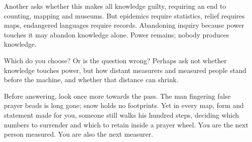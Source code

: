 Another asks whether this makes all knowledge guilty, requiring an end to counting, mapping and museums. But epidemics require statistics, relief requires maps, endangered languages require records. Abandoning inquiry because power touches it may abandon knowledge alone. Power remains; nobody produces knowledge.

Which do you choose? Or is the question wrong? Perhaps ask not whether knowledge touches power, but how distant measurers and measured people stand before the machine, and whether that distance can shrink.

Before answering, look once more towards the pass. The man fingering false prayer beads is long gone; snow holds no footprints. Yet in every map, form and statement made for you, someone still walks his hundred steps, deciding which numbers to surrender and which to retain inside a prayer wheel. You are the next person measured. You are also the next measurer.
